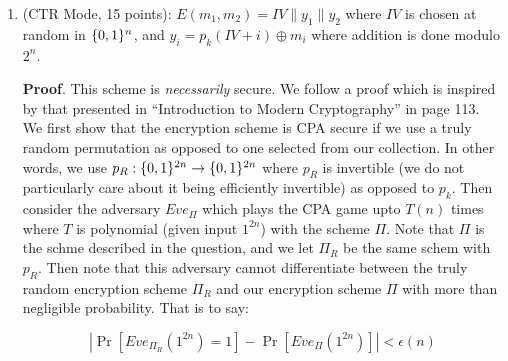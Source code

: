 \documentclass{article}
\begin{document}
\begin{enumerate}
\begin{enumerate}[,label=\alph*.]
\begin{mdbmarginx}{1ex}{0pt}{1ex}{0pt}%
\noindent{}\textbf{Proof}.  The scheme is \emph{necessarily} not CPA secure. Note that the scheme is deterministic, 
therefore by the material covered in Lecture 5, it \emph{cannot} be CPA secure. Note that all 
pseudorandom permutation collections are deterministic, therefore there is no ifs ands or buts here.
Paraphrasing the proof from lecture, we can show its insecurity by constructing the adversary Eve
which plays the CPA game as follows. It first sends as input the message $m_0 = 0^{2n}$ to 
receive the ciphertext $c_0 = E_k(m_0)$. It then choses$m_0 = 0^{2n}$ and $m_1 = 1^{2n}$ to 
receive the encryption $c^* = E_k(m_b)$. Eve then outputs $0$ if and only if $c* = c_0$ otherwise $1$. Then note
that she is always correct.%
\end{mdbmarginx}%

\item{}
(CTR Mode, 15 points): $E(m_1,m_2) = IV\|y_1\|y_2$ where $IV$ is chosen at random in $\{0,1\}^n$,  and $y_i=p_k(IV+i) \oplus m_i$ where addition is done modulo $2^n$.%

\begin{mdbmarginx}{1ex}{0pt}{1ex}{0pt}%
\noindent{}\textbf{Proof}.  This scheme is \emph{necessarily} secure. We follow a proof which is inspired by that presented in \textquotedblleft{}Introduction
to Modern Cryptography\textquotedblright{} in page 113. We first show that the encryption scheme is CPA secure if we
use a truly random permutation as opposed to one selected from our collection. In other words, we use
$p_R: \{0,1\}^{2n} \to \{0,1\}^{2n}$ where $p_R$ is invertible (we do not particularly care about it being efficiently
invertible) as opposed to $p_k$. Then consider the adversary $Eve_{\Pi}$ which plays the CPA game 
upto $T(n)$ times where $T$ is polynomial (given input $1^{2n}$) with the scheme $\Pi$. Note
that $\Pi$ is the schme described in the question, and we let $\Pi_R$ be the same schem with $p_R$.
Then note that this adversary cannot differentiate between the truly random encryption scheme 
$\Pi_R$ and our encryption scheme $\Pi$ with more than negligible probability. 
That is to say:%
\end{mdbmarginx}%
\noindent\noindent\[%
|\Pr[Eve_{\Pi_R}(1^{2n}) = 1] - \Pr[Eve_{\Pi}(1^{2n})] | < \epsilon(n)
\]%


\end{enumerate}
\end{enumerate}
\end{document}
